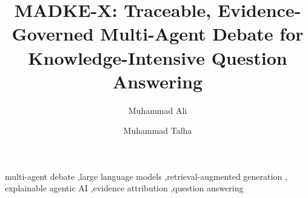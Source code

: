 \documentclass[preprint,12pt]{elsarticle}
\begin{document}
\begin{frontmatter}

\title{MADKE-X: Traceable, Evidence-Governed Multi-Agent Debate for Knowledge-Intensive Question Answering}

\author[iu]{Muhammad Ali}
\author[iu]{Muhammad Talha}



\begin{keyword}
multi-agent debate \sep large language models \sep retrieval-augmented generation \sep
explainable agentic AI \sep evidence attribution \sep question answering
\end{keyword}

\end{frontmatter}
















\end{document}
